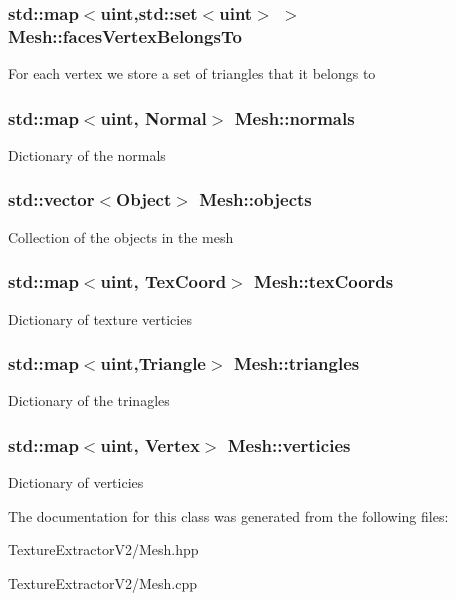 \subsubsection[{faces\+Vertex\+Belongs\+To}]{\setlength{\rightskip}{0pt plus 5cm}std\+::map$<$uint,std\+::set$<$uint$>$ $>$ Mesh\+::faces\+Vertex\+Belongs\+To}\label{class_mesh_a5ad3c61ae2ecabc596a9d9cd01f29252}
For each vertex we store a set of triangles that it belongs to \hypertarget{class_mesh_afe59cf4410182ce7c42447b635c745e1}{}
\subsubsection[{normals}]{\setlength{\rightskip}{0pt plus 5cm}std\+::map$<$uint, {\bf Normal}$>$ Mesh\+::normals}\label{class_mesh_afe59cf4410182ce7c42447b635c745e1}
Dictionary of the normals \hypertarget{class_mesh_ad221985419bdc4e3f30396073e7aa107}{}
\subsubsection[{objects}]{\setlength{\rightskip}{0pt plus 5cm}std\+::vector$<${\bf Object}$>$ Mesh\+::objects}\label{class_mesh_ad221985419bdc4e3f30396073e7aa107}
Collection of the objects in the mesh \hypertarget{class_mesh_a615f86622e292b9bfa581cfad823b375}{}
\subsubsection[{tex\+Coords}]{\setlength{\rightskip}{0pt plus 5cm}std\+::map$<$uint, {\bf Tex\+Coord}$>$ Mesh\+::tex\+Coords}\label{class_mesh_a615f86622e292b9bfa581cfad823b375}
Dictionary of texture verticies \hypertarget{class_mesh_a6afb31bd01dac6b21a548341d389b421}{}
\subsubsection[{triangles}]{\setlength{\rightskip}{0pt plus 5cm}std\+::map$<$uint,{\bf Triangle}$>$ Mesh\+::triangles}\label{class_mesh_a6afb31bd01dac6b21a548341d389b421}
Dictionary of the trinagles \hypertarget{class_mesh_a2cef656e11f17c6974a418c4fa0755fe}{}
\subsubsection[{verticies}]{\setlength{\rightskip}{0pt plus 5cm}std\+::map$<$uint, {\bf Vertex}$>$ Mesh\+::verticies}\label{class_mesh_a2cef656e11f17c6974a418c4fa0755fe}
Dictionary of verticies 

The documentation for this class was generated from the following files\+:\begin{DoxyCompactItemize}
\item 
Texture\+Extractor\+V2/Mesh.\+hpp\item 
Texture\+Extractor\+V2/Mesh.\+cpp\end{DoxyCompactItemize}
